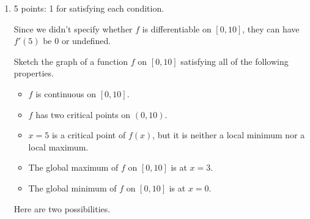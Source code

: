 \documentclass{article}
\begin{document}
\begin{enumerate}
\begin{enumerate}
  \end{enumerate}

  \begin{problemonly}
    \emph{Note:} You should have found 3 critical points. If you didn't, go back and fix it!
  \end{problemonly}

\item  

  \begin{grading}
    5 points: 1 for satisfying each condition.

    Since we didn't specify whether $f$ is differentiable on $[0, 10]$, they can have $f'(5)$ be 0 or undefined. 
  \end{grading}

  \begin{problem}[\nstretch{1.5}]
    Sketch the graph of a function $f$ on $[0, 10]$ satisfying all of the following properties.
    \begin{itemize}[nosep]
    \item $f$ is continuous on $[0, 10]$. 
    \item $f$ has two critical points on $(0, 10)$.
    \item $x = 5$ is a critical point of $f(x)$, but it is neither a local minimum nor a local maximum.
    \item The global maximum of $f$ on $[0, 10]$ is at $x = 3$.
    \item The global minimum of $f$ on $[0, 10]$ is at $x = 0$. 
    \end{itemize}
  \end{problem}

  \begin{solution}
    Here are two possibilities.
    \begin{center}
        \hspace{0.5in}
      \end{center}
  \end{solution}


\end{enumerate}
\end{document}
